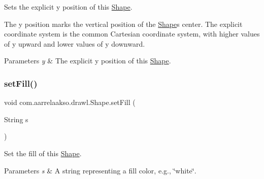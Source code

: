 Sets the explicit y position of this \hyperlink{classcom_1_1aarrelaakso_1_1drawl_1_1_shape}{Shape}. 

The y position marks the vertical position of the \hyperlink{classcom_1_1aarrelaakso_1_1drawl_1_1_shape}{Shape}\textquotesingle{}s center. The explicit coordinate system is the common Cartesian coordinate system, with higher values of y upward and lower values of y downward.


\begin{DoxyParams}{Parameters}
{\em y} & The explicit y position of this \hyperlink{classcom_1_1aarrelaakso_1_1drawl_1_1_shape}{Shape}. \\
\hline
\end{DoxyParams}
\mbox{\label{classcom_1_1aarrelaakso_1_1drawl_1_1_shape_a2a2868c85bfbf4d2940d929950001b3d}} 
\subsubsection{\texorpdfstring{set\+Fill()}{setFill()}}
{\footnotesize\ttfamily void com.\+aarrelaakso.\+drawl.\+Shape.\+set\+Fill (\begin{DoxyParamCaption}\item[{String}]{s }\end{DoxyParamCaption})\hspace{0.3cm}{\ttfamily [inherited]}}



Set the fill of this \hyperlink{classcom_1_1aarrelaakso_1_1drawl_1_1_shape}{Shape}. 


\begin{DoxyParams}{Parameters}
{\em s} & A string representing a fill color, e.\+g., \char`\"{}white\char`\"{}. \\
\hline
\end{DoxyParams}
\mbox{\label{classcom_1_1aarrelaakso_1_1drawl_1_1_shape_a01a28173688c7c955b0c7558ac3ff5df}} 
